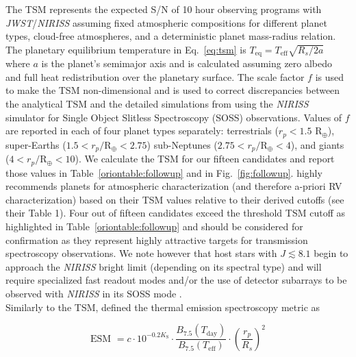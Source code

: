 \noindent The TSM represents the expected S/N of 10 hour observing programs with \emph{JWST}/\emph{NIRISS}
assuming fixed atmospheric compositions for different planet types, cloud-free atmospheres, and a
deterministic planet mass-radius relation. The planetary equilibrium temperature in Eq.~\ref{eq:tsm}
is $T_{\text{eq}} = T_{\text{eff}} \sqrt{R_s/2a}$ where $a$ is the planet's semimajor axis and is calculated
assuming zero albedo and full heat redistribution over the planetary surface. The scale factor $f$ is
used to make the TSM non-dimensional and is used to correct discrepancies between the analytical TSM
and the detailed simulations from \cite{louie18} using the \emph{NIRISS} simulator for Single Object
Slitless Spectroscopy (SOSS) observations. Values of $f$ are reported in \cite{kempton18} each of four
planet types separately: terrestrials ($r_p < 1.5$ R$_{\oplus}$), super-Earths ($1.5 < r_p/\text{R}_{\oplus} < 2.75$) 
sub-Neptunes ($2.75 < r_p/\text{R}_{\oplus} < 4$), and giants ($4 < r_p/\text{R}_{\oplus} < 10$). 
We calculate the TSM for our fifteen candidates and report those values in Table~\ref{oriontable:followup} and in
Fig.~\ref{fig:followup}. \cite{kempton18} highly recommends planets for atmospheric characterization
(and therefore a-priori RV characterization) based on their TSM values relative to their derived cutoffs (see
their Table 1). Four out of fifteen candidates exceed the threshold TSM cutoff as highlighted in Table~\ref{oriontable:followup}
and should be considered for confirmation as they represent highly attractive targets for transmission spectroscopy
observations. We note however that host stars with $J\lesssim 8.1$ begin to approach the \emph{NIRISS}
bright limit (depending on its spectral type) and will require specialized fast readout modes and/or the use
of detector subarrays to be observed with \emph{NIRISS} in its SOSS mode \citep{beichman14}. \\

Similarly to the TSM, \cite{kempton18} defined the thermal emission spectroscopy metric as

\begin{equation}
  \text{ESM } = c \cdot 10^{-0.2K_{\text{S}}} \cdot \frac{B_{7.5}(T_{\text{day}})}{B_{7.5}(T_{\text{eff}})} \cdot
  \left( \frac{r_p}{R_s} \right)^2
\end{equation}

